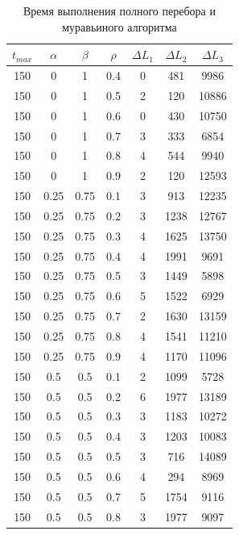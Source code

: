 \documentclass[12pt]{report}
\begin{document}
\begin{table}[H]
\begin{center}
\begin{tabular}{|c|c|c|c|c|c|c|}
			\end{tabular}
		\end{center}
	\end{table}
	\begin{table}[H]
		\begin{center}
			\caption[]{\label{tbl:only4} Время выполнения полного перебора и муравьиного алгоритма}
			\begin{tabular}{|c|c|c|c|c|c|c|}
				\hline
				$t_{max}$ & $\alpha$ & $\beta$ &$\rho$ & $\Delta L_{1}$ & $\Delta L_{2}$ & $\Delta L_{3}$\\
				\hline		150 & 0 & 1 & 0.4 & 0 & 481 & 9986 \\
				150 & 0 & 1 & 0.5 & 2 & 120 & 10886 \\
				150 & 0 & 1 & 0.6 & 0 & 430 & 10750 \\
				150 & 0 & 1 & 0.7 & 3 & 333 & 6854 \\
				150 & 0 & 1 & 0.8 & 4 & 544 & 9940 \\
				150 & 0 & 1 & 0.9 & 2 & 120 & 12593 \\
				150 & 0.25 & 0.75 & 0.1 & 3 & 913 & 12235 \\
				150 & 0.25 & 0.75 & 0.2 & 3 & 1238 & 12767 \\
				150 & 0.25 & 0.75 & 0.3 & 4 & 1625 & 13750 \\
				150 & 0.25 & 0.75 & 0.4 & 4 & 1991 & 9691 \\
				150 & 0.25 & 0.75 & 0.5 & 3 & 1449 & 5898 \\
				150 & 0.25 & 0.75 & 0.6 & 5 & 1522 & 6929 \\
				150 & 0.25 & 0.75 & 0.7 & 2 & 1630 & 13159 \\
				150 & 0.25 & 0.75 & 0.8 & 4 & 1541 & 11210 \\
				150 & 0.25 & 0.75 & 0.9 & 4 & 1170 & 11096 \\
				150 & 0.5 & 0.5 & 0.1 & 2 & 1099 & 5728 \\
				150 & 0.5 & 0.5 & 0.2 & 6 & 1977 & 13189 \\
				150 & 0.5 & 0.5 & 0.3 & 3 & 1183 & 10272 \\
				150 & 0.5 & 0.5 & 0.4 & 3 & 1203 & 10083 \\
				150 & 0.5 & 0.5 & 0.5 & 3 & 716 & 14089 \\
				150 & 0.5 & 0.5 & 0.6 & 4 & 294 & 8969 \\
				150 & 0.5 & 0.5 & 0.7 & 5 & 1754 & 9116 \\
				150 & 0.5 & 0.5 & 0.8 & 3 & 1977 & 9097 \\

\end{tabular}
\end{center}
\end{table}
\end{document}
